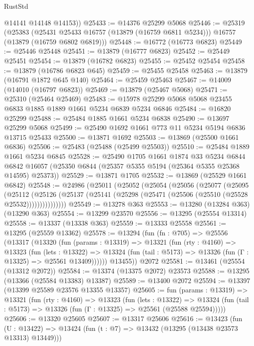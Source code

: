 \begin{lexlean}{RustStd}
\begin{coremodule}
        @14141
        @14148
        @14153))
@25433 := @14376 @25299 @5068
@25446 := @25319
    (@25383
      (@25431 @25433 @16757 (@13879 (@16759 @6811 @5234)))
      @16757
      (@13879 (@16759 @6802 @6819)))
@25448 := @16772 (@16773 @6823)
@25449 := @25446 @25448
@25451 := @13879 (@16777 @6823)
@25452 := @25449 @25451
@25454 := @13879 (@16782 @6823)
@25455 := @25452 @25454
@25458 := @13879 (@16786 @6823 @645)
@25459 := @25455 @25458
@25463 := @13879 (@16791 @1872 @645 @140)
@25464 := @25459 @25463
@25467 := @14009 (@14010 (@16797 @6823))
@25469 := @13879 (@25467 @5068)
@25471 := @25310 (@25464 @25469)
@25483 := @15978 @25299 @5068 @5068 @23455 @6833 @1885 @1889 @1661 @5234 @6839 @5234 @6846
@25484 := @16820 @25299
@25488 := @25484 @1885 @1661 @5234 @6838
@25490 := @13697 @25299 @5068
@25499 := @25490 @1692 @1661 @773 @11 @5234 @5194 @6836 @13715 @25433
@25500 := @13871 @1692
@25503 := @13869 (@25500 @1661 @6836)
@25506 := @25483 (@25488 (@25499 @25503))
@25510 := @25484 @1889 @1661 @5234 @6845
@25528 := @25490
    @1705
    @1661
    @1874
    @33
    @5234
    @6844
    @6842
    @16057
    (@25350 @6844 (@25357 @5355 @5194 (@25364 @5355 @25368 @14595) @25373))
@25529 := @13871 @1705
@25532 := @13869 (@25529 @1661 @6842)
@25548 := @24986
    (@25011
      (@25052
        (@25054
          (@25056
            (@25077
              (@25095
                (@25112
                  (@25126
                    (@25137 (@25141 (@25298 (@25471 (@25506 (@25510 (@25528 @25532)))))))))))))))
@25549 := @13278 @363
@25553 := @13280 (@13284 @363) (@13290 @363)
@25554 := @13299 @23570
@25556 := @13295 (@25554 @13314)
@25558 := @13337 (@13338 @363)
@25559 := @13333 @25558
@25561 := @13295 (@25559 @13362)
@25578 := @13294
    (fun (fn : @705) =>
    @25556
      (@13317
        (@13320
          (fun (params : @13319) =>
          @13321
            (fun (rty : @4160) =>
            @13323
              (fun (lets : @13322) =>
              @13324 (fun (tail : @5173) => @13326 (fun (Γ : @13325) => @25561 @13409))))))
        @13455))
    @2072
@25581 := @13461 (@25554 (@13312 @2072))
@25584 := @13374 (@13375 @2072) @23573
@25588 := @13295 (@13366 (@25584 @13383) @13387)
@25589 := @13400 @2072
@25594 := @13397 (@13399 @25589 @23576 @13355 @13357)
@25605 := fun (params : @13319) =>
  @13321
    (fun (rty : @4160) =>
    @13323
      (fun (lets : @13322) =>
      @13324 (fun (tail : @5173) => @13326 (fun (Γ : @13325) => @25561 (@25588 @25594)))))
@25606 := @13320 @25605
@25607 := @13317 @25606
@25616 := @13423
    (fun (U : @13422) => @13424 (fun (t : @7) => @13432 (@13295 (@13438 @23573 @13313) @13449)))

\end{coremodule}
\end{lexlean}
